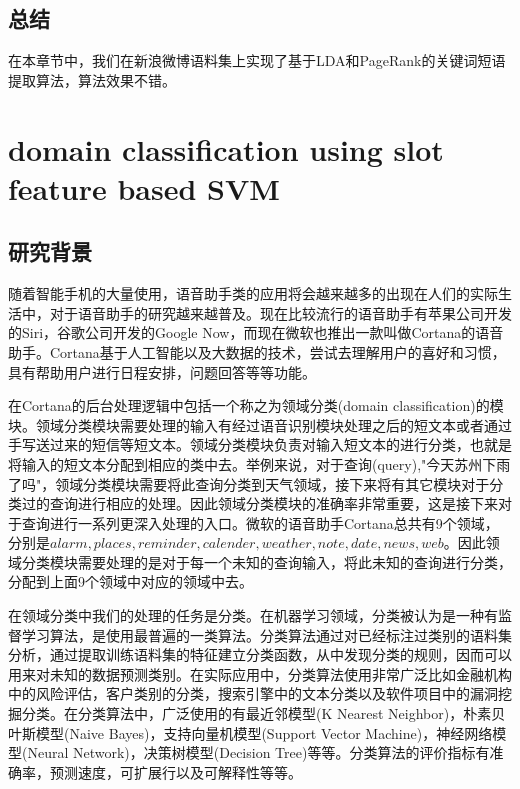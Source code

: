 \documentclass[master]{njuthesis}
\begin{document}
\section{总结}

在本章节中，我们在新浪微博语料集上实现了基于LDA和PageRank的关键词短语提取算法，算法效果不错。

\chapter{domain classification using slot feature based SVM}\label{chapter_smallworld}

\section{研究背景}

    随着智能手机的大量使用，语音助手类的应用将会越来越多的出现在人们的实际生活中，对于语音助手的研究越来越普及。现在比较流行的语音助手有苹果公司开发的Siri，谷歌公司开发的Google Now，而现在微软也推出一款叫做Cortana的语音助手。Cortana基于人工智能以及大数据的技术，尝试去理解用户的喜好和习惯，具有帮助用户进行日程安排，问题回答等等功能。

    在Cortana的后台处理逻辑中包括一个称之为领域分类(domain classification)的模块。领域分类模块需要处理的输入有经过语音识别模块处理之后的短文本或者通过手写送过来的短信等短文本。领域分类模块负责对输入短文本的进行分类，也就是将输入的短文本分配到相应的类中去。举例来说，对于查询(query),"今天苏州下雨了吗"，领域分类模块需要将此查询分类到天气领域，接下来将有其它模块对于分类过的查询进行相应的处理。因此领域分类模块的准确率非常重要，这是接下来对于查询进行一系列更深入处理的入口。微软的语音助手Cortana总共有9个领域，分别是$alarm,places,reminder,calender,weather,note,date,news,web$。因此领域分类模块需要处理的是对于每一个未知的查询输入，将此未知的查询进行分类，分配到上面9个领域中对应的领域中去。

    在领域分类中我们的处理的任务是分类。在机器学习领域，分类被认为是一种有监督学习算法，是使用最普遍的一类算法。分类算法通过对已经标注过类别的语料集分析，通过提取训练语料集的特征建立分类函数，从中发现分类的规则，因而可以用来对未知的数据预测类别。在实际应用中，分类算法使用非常广泛比如金融机构中的风险评估，客户类别的分类，搜索引擎中的文本分类以及软件项目中的漏洞挖掘分类。在分类算法中，广泛使用的有最近邻模型(K Nearest Neighbor)，朴素贝叶斯模型(Naive Bayes)，支持向量机模型(Support Vector Machine)，神经网络模型(Neural Network)，决策树模型(Decision Tree)等等。分类算法的评价指标有准确率，预测速度，可扩展行以及可解释性等等。
    
\end{document}
